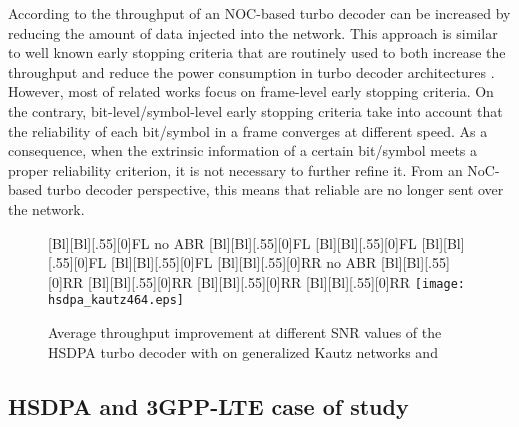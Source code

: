 \documentclass[10pt,twocolumn,journal]{IEEEtran}
\begin{document}
According to \cite{baghdadi_EL06} the throughput of an NOC-based turbo decoder can be increased by reducing the 
amount of data injected into the network. This approach is similar to well known early stopping criteria 
that are routinely used to both increase the throughput and reduce the power consumption in turbo decoder architectures 
\cite{chandrakasan_CICC10}. 
However, most of related works focus on frame-level early stopping criteria. On the contrary, bit-level/symbol-level 
early stopping criteria \cite{kim_CL06} take into account that the reliability of each bit/symbol in a frame converges at 
different speed. As a consequence, when the extrinsic information of a certain bit/symbol meets a proper reliability 
criterion, it is not necessary to further refine it. From an NoC-based turbo decoder perspective, this means 
that reliable  are no longer sent over the network. 
\begin{figure}
    \centering
      [Bl][Bl][.55][0]{FL no ABR}
      [Bl][Bl][.55][0]{FL }
      [Bl][Bl][.55][0]{FL }
      [Bl][Bl][.55][0]{FL }
      [Bl][Bl][.55][0]{FL }
      [Bl][Bl][.55][0]{RR no ABR}
      [Bl][Bl][.55][0]{RR }
      [Bl][Bl][.55][0]{RR }
      [Bl][Bl][.55][0]{RR }
      [Bl][Bl][.55][0]{RR }
      \texttt{[image: hsdpa\_kautz464.eps]}
\caption{Average throughput improvement at different SNR values of the HSDPA  turbo decoder with  
on generalized Kautz networks  and }
\label{fig:ABR_hsdpa4}
\end{figure}

\subsection{HSDPA and 3GPP-LTE case of study}
\label{subsec:hsdpa_lte}
\end{document}
